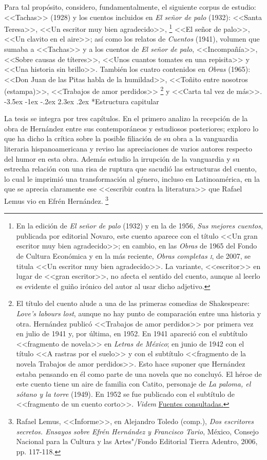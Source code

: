 \documentclass[14pt,twoside,final]{extbook} %
\makeatletter
\let\oldfootnote\footnote
\renewcommand\footnote[1]{%
\oldfootnote{\hspace{1mm}#1}}
\renewcommand\section{\@startsection {section}{1}{\z@}%
                                     {-3.5ex \@plus -1ex \@minus -.2ex}%
                                     {2.3ex \@plus .2ex}%
                                     {\normalfont\large\bfseries\sc}}
\makeatother
\begin{document}
Para tal propósito, considero, fundamentalmente, el siguiente corpus de estudio: <<Tachas>> (1928) y los cuentos incluidos en \emph{El señor de palo} (1932): <<Santa Teresa>>, <<Un escritor muy bien agradecido>>,\footnote{En la edición de \emph{El señor de palo} (1932) y en la de 1956, \emph{Sus mejores cuentos}, publicada por editorial Novaro, este cuento aparece con el título <<Un gran escritor muy bien agradecido>>; en cambio, en las \emph{Obras} de 1965 del Fondo de Cultura Económica y en la más reciente, \emph{Obras completas \textsc{i}}, de 2007, se titula <<Un escritor muy bien agradecido>>. La variante, <<escritor>> en lugar de <<gran escritor>>, no afecta el sentido del cuento, aunque al leerlo es evidente el guiño irónico del autor al usar dicho adjetivo.} <<El señor de palo>>, <<Un clavito en el aire>>; así como los relatos de \emph{Cuentos} (1941), volumen que sumaba a <<Tachas>> y a los cuentos de \emph{El señor de palo}, <<Incompañía>>, <<Sobre causas de títeres>>, <<Unos cuantos tomates en una repisita>> y <<Una historia sin brillo>>. También los cuatro contenidos en \emph{Obras} (1965): <<Don Juan de las Pitas habla de la humildad>>, <<Toñito entre nosotros (estampa)>>, <<Trabajos de amor perdidos>>\footnote{El título del cuento alude a una de las primeras comedias de Shakespeare: \emph{Love's labours lost}, aunque no hay punto de comparación entre una historia y otra. Hernández publicó <<Trabajos de amor perdidos>> por primera vez en julio de 1941 y, por última, en 1952. En 1941 apareció con el subtítulo <<fragmento de novela>> en \emph{Letras de México}; en junio de 1942 con el título <<A rastras por el suelo>> y con el subtítulo <<fragmento de la novela Trabajos de amor perdidos>>. Esto hace suponer que Hernández estaba pensando en él como parte de una novela que no concluyó. El héroe de este cuento tiene un aire de familia con Catito, personaje de \emph{La paloma, el sótano y la torre} (1949). En 1952 se fue publicado con el subtítulo de <<fragmento de un cuento corto>>. \emph{Videm} \hyperref[bib:hernandez1952]{Fuentes consultadas.}} y <<Carta tal vez de más>>.
\section*{Estructura capitular}\label{sec:estructura-capitular}
La tesis se integra por tres capítulos. En el primero analizo la recepción de la obra de Hernández entre sus contemporáneos y estudiosos posteriores; exploro lo que ha dicho la crítica sobre la posible filiación de su obra a la vanguardia literaria hispanoamericana y reviso las apreciaciones de varios autores respecto del humor en esta obra. Además estudio la irrupción de la vanguardia y su estrecha relación con una risa de ruptura que sacudió las estructuras del cuento, lo cual le imprimió una transformación al género, incluso en Latinoamérica, en la que se aprecia claramente ese <<escribir contra la literatura>> que Rafael Lemus vio en Efrén Hernández.\footnote{Rafael Lemus, <<Informe>>, en Alejandro Toledo (comp.), \emph{Dos escritores secretos. Ensayos sobre Efrén Hernández y Francisco Tario}, México, Consejo Nacional para la Cultura y las Artes"/Fondo Editorial Tierra Adentro, 2006, pp. 117-118.}
\end{document}

